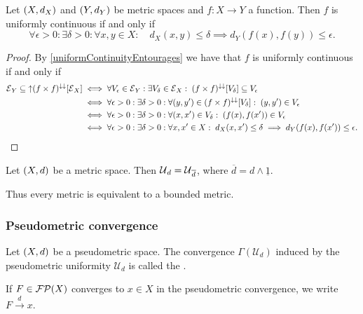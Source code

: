 \begin{lemma} \label{uniformContinuityMetricSpaces}
Let $\sSet{X, d_X}$ and $\sSet{Y, d_Y}$ be metric spaces and $f:X\to Y$ a function. Then $f$ is uniformly continuous \textup{if and only if}
\[ \forall \epsilon >0: \exists \delta >0: \forall x,y\in X: \quad d_X(x,y) \leq \delta \implies d_Y(f(x), f(y)) \leq \epsilon. \]
\end{lemma}
\begin{proof}
By \ref{uniformContinuityEntourages} we have that $f$ is uniformly continuous \textup{if and only if}
\begin{align*}
\operatorname{\mathcal{E}}_Y \subseteq \operatorname{\uparrow}(f\times f)^{\downarrow\downarrow}[\operatorname{\mathcal{E}}_X] &\iff \forall V_\epsilon \in \operatorname{\mathcal{E}}_Y: \exists V_\delta \in \operatorname{\mathcal{E}}_X: \; (f\times f)^{\downarrow\downarrow}[V_\delta] \subseteq V_\epsilon \\
&\iff \forall \epsilon>0: \exists \delta>0: \forall (y,y')\in (f\times f)^{\downarrow\downarrow}[V_\delta]: \; (y,y')\in V_\epsilon \\
&\iff \forall \epsilon>0: \exists \delta>0: \forall (x,x')\in V_\delta:\; (f(x),f(x'))\in V_\epsilon \\
&\iff \forall \epsilon>0: \exists \delta>0: \forall x,x'\in X: \; d_X(x,x')\leq \delta \implies d_Y(f(x),f(x'))\leq \epsilon.
\end{align*}
\end{proof}

\begin{lemma}
Let $\sSet{X,d}$ be a metric space. Then $\operatorname{\mathcal{U}}_d = \operatorname{\mathcal{U}}_{\overline{d}}$, where $\overline{d} = d \wedge \underline{1}$.
\end{lemma}
Thus every metric is equivalent to a bounded metric.

\subsubsection{Pseudometric convergence}
\begin{definition}
Let $\sSet{X,d}$ be a pseudometric space. The convergence $\Gamma(\mathcal{U}_d)$ induced by the pseudometric uniformity $\mathcal{U}_d$ is called the .

If $F\in\operatorname{\mathcal{FP}}(X)$ converges to $x\in X$ in the pseudometric convergence, we write $F\overset{d}{\longrightarrow} x$.
\end{definition}

